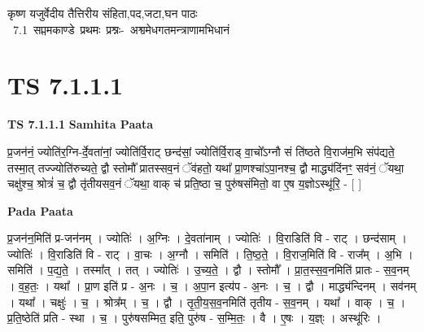 \documentclass[17pt]{extarticle}
\begin{document}
\begin{titlepage}
    \begin{center}
 
\begin{sanskrit}
    { \Large
    कृष्ण यजुर्वेदीय तैत्तिरीय संहिता,पद,जटा,घन पाठः 
    }
    \\
    \vspace{2.5cm}
    \mbox{ \Large
    7.1      सप्तमकाण्डे प्रथमः प्रश्नः- अश्वमेधगतमन्त्राणामभिधानं   }
\end{sanskrit}
\end{center}

\end{titlepage}
\tableofcontents
{}
\pagebreak


\section{ TS 7.1.1.1 }

\textbf{TS 7.1.1.1 } \newline
\textbf{Samhita Paata} \newline

प्र॒जन॑नं॒ ज्योति॑र॒ग्नि-र्दे॒वता॑नां॒ ज्योति॑र्वि॒राट् छन्द॑सां॒ ज्योति॑र्वि॒राड् वा॒चो᳚ऽग्नौ सं ति॑ष्ठते वि॒राज॑म॒भि संप॑द्यते॒ तस्मा॒त् तज्ज्योति॑रुच्यते॒ द्वौ स्तोमौ᳚ प्रातस्सव॒नं ॅव॑हतो॒ यथा᳚ प्रा॒णश्चा॑ऽपा॒नश्च॒ द्वौ माद्ध्य॑दिंनꣳ॒॒ सव॑नं॒ ॅयथा॒ चक्षु॑श्च॒ श्रोत्रं॑ च॒ द्वौ तृ॑तीयसव॒नं ॅयथा॒ वाक् च॑ प्रति॒ष्ठा च॒ पुरु॑षसंमितो॒ वा ए॒ष य॒ज्ञोऽस्थू॑रि॒ - [  ] \newline

\textbf{Pada Paata} \newline

प्र॒जन॑न॒मिति॑ प्र-जन॑नम् । ज्योतिः॑ । अ॒ग्निः । दे॒वता॑नाम् । ज्योतिः॑ । वि॒राडिति॑ वि - राट् । छन्द॑साम् । ज्योतिः॑ । वि॒राडिति॑ वि - राट् । वा॒चः । अ॒ग्नौ । समिति॑ । ति॒ष्ठ॒ते॒ । वि॒राज॒मिति॑ वि - राज᳚म् । अ॒भि । समिति॑ । प॒द्य॒ते॒ । तस्मा᳚त् । तत् । ज्योतिः॑ । उ॒च्य॒ते॒ । द्वौ । स्तोमौ᳚ । प्रा॒त॒स्स॒व॒नमिति॑ प्रातः - स॒व॒नम् । व॒ह॒तः॒ । यथा᳚ । प्रा॒ण इति॑ प्र - अ॒नः । च॒ । अ॒पा॒न इत्य॑प - अ॒नः । च॒ । द्वौ । माद्ध्य॑न्दिनम् । सव॑नम् । यथा᳚ । चक्षुः॑ । च॒ । श्रोत्र᳚म् । च॒ । द्वौ । तृ॒ती॒य॒स॒व॒नमिति॑ तृतीय - स॒व॒नम् । यथा᳚ । वाक् । च॒ । प्र॒ति॒ष्ठेति॑ प्रति - स्था । च॒ । पुरु॑षसम्मित॒ इति॒ पुरु॑ष - स॒म्मि॒तः॒ । वै । ए॒षः । य॒ज्ञ्ः । अस्थू॑रिः ।  \newline
\end{document}
